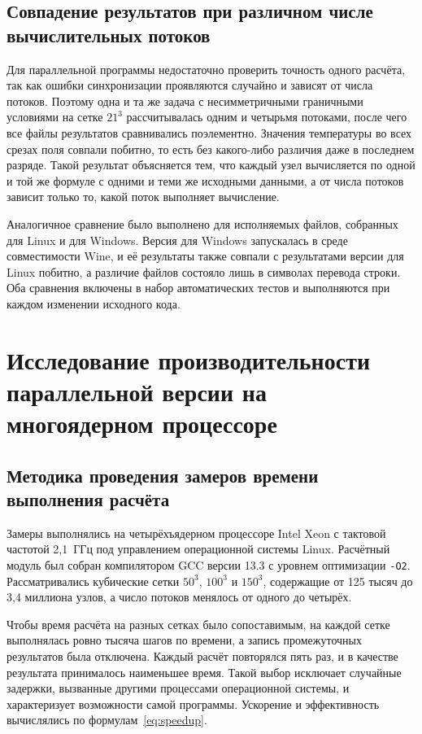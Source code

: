 \subsection{Совпадение результатов при различном числе вычислительных потоков}

Для параллельной программы недостаточно проверить точность одного расчёта, так как ошибки синхронизации проявляются случайно и зависят от числа потоков. Поэтому одна и та же задача с несимметричными граничными условиями на сетке $21^3$ рассчитывалась одним и четырьмя потоками, после чего все файлы результатов сравнивались поэлементно. Значения температуры во всех срезах поля совпали побитно, то есть без какого-либо различия даже в последнем разряде. Такой результат объясняется тем, что каждый узел вычисляется по одной и той же формуле с одними и теми же исходными данными, а от числа потоков зависит только то, какой поток выполняет вычисление.

Аналогичное сравнение было выполнено для исполняемых файлов, собранных для Linux и для Windows. Версия для Windows запускалась в среде совместимости Wine, и её результаты также совпали с результатами версии для Linux побитно, а различие файлов состояло лишь в символах перевода строки. Оба сравнения включены в набор автоматических тестов и выполняются при каждом изменении исходного кода.

\section{Исследование производительности параллельной версии на многоядерном процессоре}

\subsection{Методика проведения замеров времени выполнения расчёта}

Замеры выполнялись на четырёхъядерном процессоре Intel Xeon с тактовой частотой 2,1~ГГц под управлением операционной системы Linux. Расчётный модуль был собран компилятором GCC версии 13.3 с уровнем оптимизации \texttt{-O2}. Рассматривались кубические сетки $50^3$, $100^3$ и $150^3$, содержащие от 125 тысяч до 3,4 миллиона узлов, а число потоков менялось от одного до четырёх.

Чтобы время расчёта на разных сетках было сопоставимым, на каждой сетке выполнялась ровно тысяча шагов по времени, а запись промежуточных результатов была отключена. Каждый расчёт повторялся пять раз, и в качестве результата принималось наименьшее время. Такой выбор исключает случайные задержки, вызванные другими процессами операционной системы, и характеризует возможности самой программы. Ускорение и эффективность вычислялись по формулам~\eqref{eq:speedup}.

